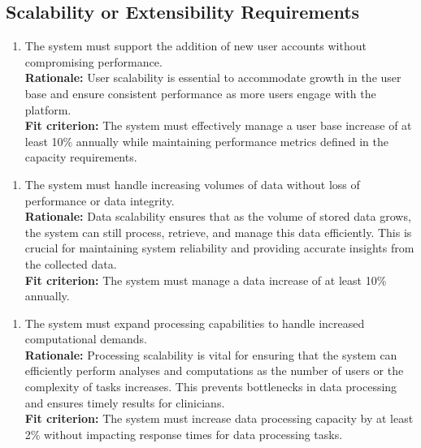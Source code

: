 \documentclass[12pt]{article}
\begin{document}
\subsection{Scalability or Extensibility Requirements}
\begin{enumerate}[{PR-SE}1. ]
  \item The system must support the addition of new user accounts without compromising performance.\\
  \textbf{Rationale: }User scalability is essential to accommodate growth in the user base and ensure consistent performance as more users engage with the platform.\\
  \textbf{Fit criterion: }The system must effectively manage a user base increase of at least 10\% annually while maintaining performance metrics defined in the capacity requirements.  
\end{enumerate}
\begin{enumerate}[{PR-SE}2. ]
  \item The system must handle increasing volumes of data without loss of performance or data integrity.\\
  \textbf{Rationale: }Data scalability ensures that as the volume of stored data grows, the system can still process, retrieve, and manage this data efficiently. This is crucial for maintaining system reliability and providing accurate insights from the collected data.\\
  \textbf{Fit criterion: }The system must manage a data increase of at least 10\% annually.  
\end{enumerate}
\begin{enumerate}[{PR-SE}3. ]
  \item The system must expand processing capabilities to handle increased computational demands.\\
  \textbf{Rationale: }Processing scalability is vital for ensuring that the system can efficiently perform analyses and computations as the number of users or the complexity of tasks increases. This prevents bottlenecks in data processing and ensures timely results for clinicians.\\
  \textbf{Fit criterion: }The system must increase data processing capacity by at least 2\% without impacting response times for data processing tasks.  
\end{enumerate}
\end{document}

